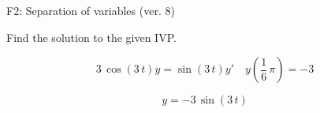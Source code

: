 \begin{exercise}
  \begin{exerciseTitle}F2: Separation of variables (ver. 8)\end{exerciseTitle}
  \begin{exerciseStatement}
    
Find the solution to the given IVP.

    
\[3 \, \cos\left(3 \, t\right) y= \sin\left(3 \, t\right) y'\hspace{1em} y\left( \frac{1}{6} \, \pi \right)= -3\]

  \end{exerciseStatement}
  \begin{exerciseAnswer}
    
\[y= -3 \, \sin\left(3 \, t\right)\]

  \end{exerciseAnswer}
\end{exercise}